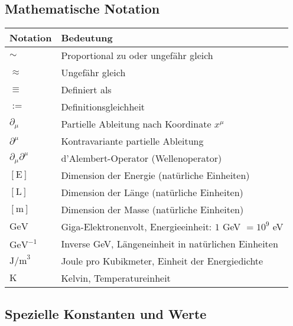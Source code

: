 \documentclass[12pt,a4paper]{article}
\numberwithin{equation}{section}
\begin{document}
	\subsection*{Mathematische Notation}
	
	\begin{longtable}{p{2cm} p{12cm}}
		\toprule
		\textbf{Notation} & \textbf{Bedeutung} \\
		\midrule
		\endhead
		
		$\sim$ & Proportional zu oder ungefähr gleich \\
		$\approx$ & Ungefähr gleich \\
		$\equiv$ & Definiert als \\
		$:=$ & Definitionsgleichheit \\
		$\partial_\mu$ & Partielle Ableitung nach Koordinate $x^\mu$ \\
		$\partial^\mu$ & Kontravariante partielle Ableitung \\
		$\partial_\mu \partial^\mu$ & d'Alembert-Operator (Wellenoperator) \\
		$[\text{E}]$ & Dimension der Energie (natürliche Einheiten) \\
		$[\text{L}]$ & Dimension der Länge (natürliche Einheiten) \\
		$[\text{m}]$ & Dimension der Masse (natürliche Einheiten) \\
		$\text{GeV}$ & Giga-Elektronenvolt, Energieeinheit: $1$ GeV $= 10^9$ eV \\
		$\text{GeV}^{-1}$ & Inverse GeV, Längeneinheit in natürlichen Einheiten \\
		$\text{J/m}^3$ & Joule pro Kubikmeter, Einheit der Energiedichte \\
		$\text{K}$ & Kelvin, Temperatureinheit \\
		\bottomrule
	\end{longtable}
	
	\subsection*{Spezielle Konstanten und Werte}
	
\end{document}
